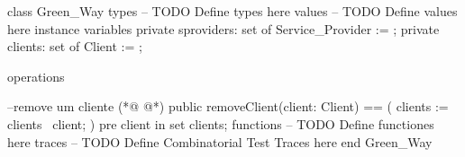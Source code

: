 \begin{vdmpp}[breaklines=true]
class Green_Way
types
-- TODO Define types here
values
-- TODO Define values here
instance variables
 private sproviders: set of Service_Provider := { };
 private clients: set of Client := {};

operations

--remove um cliente    
(*@
\label{removeClient:13}
@*)
  public removeClient(client: Client) == 
  (  
  clients := clients \ {client};
  )
  pre
   client in set clients;
functions
-- TODO Define functiones here
traces
-- TODO Define Combinatorial Test Traces here
end Green_Way
\end{vdmpp}
